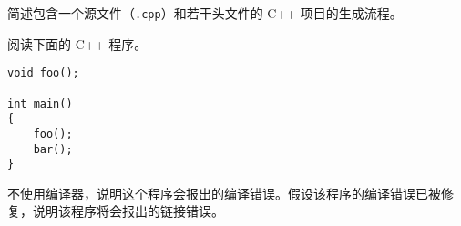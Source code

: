 
\begin{problemset}
	\item 简述包含一个源文件（\lstinline[language={}]{.cpp}）和若干头文件的 C++ 项目的生成流程。

	\item 阅读下面的 C++ 程序。

	\begin{lstlisting}[language={[latest]C++}, moreemph={[2]foo}]
void foo();

int main()
{
	foo();
	bar();
}
	\end{lstlisting}

	不使用编译器，说明这个程序会报出的编译错误。假设该程序的编译错误已被修复，说明该程序将会报出的链接错误。
\end{problemset}
